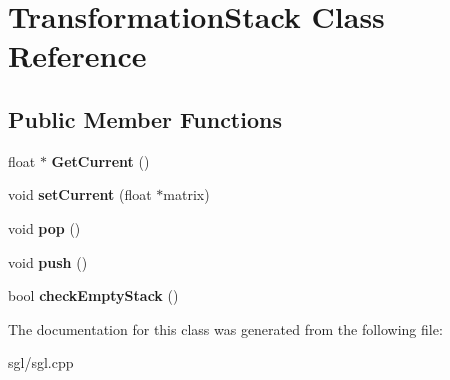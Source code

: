 \hypertarget{class_transformation_stack}{}\section{Transformation\+Stack Class Reference}
\label{class_transformation_stack}
\subsection*{Public Member Functions}
\begin{DoxyCompactItemize}
\item 
\mbox{\label{class_transformation_stack_a30b49bc49cd2b57494c1b25f60e093f7}} 
float $\ast$ {\bfseries Get\+Current} ()
\item 
\mbox{\label{class_transformation_stack_ae7073bc34c342e84f34012bfb90e0046}} 
void {\bfseries set\+Current} (float $\ast$matrix)
\item 
\mbox{\label{class_transformation_stack_a1c4966cc4a17a9815bda6cbe659bd48b}} 
void {\bfseries pop} ()
\item 
\mbox{\label{class_transformation_stack_a0c1b1e028385d0e5cfc8fa7892637d98}} 
void {\bfseries push} ()
\item 
\mbox{\label{class_transformation_stack_ad9e01004403853199f72df5ddf067360}} 
bool {\bfseries check\+Empty\+Stack} ()
\end{DoxyCompactItemize}


The documentation for this class was generated from the following file\+:\begin{DoxyCompactItemize}
\item 
sgl/sgl.\+cpp\end{DoxyCompactItemize}
